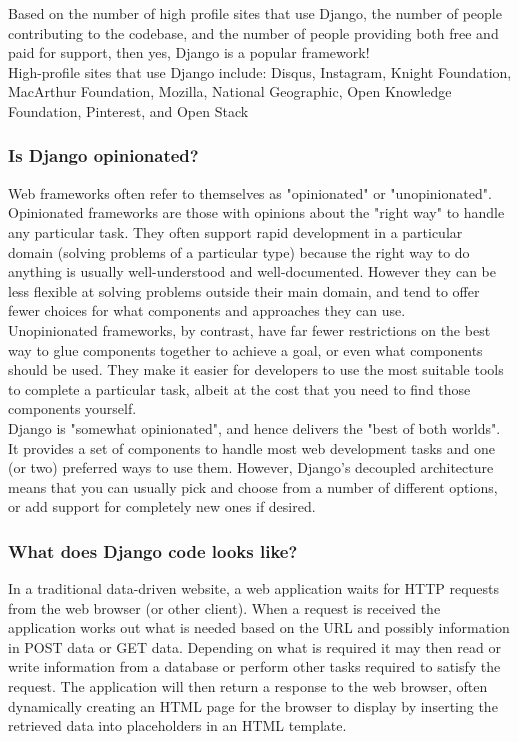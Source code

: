 Based on the number of high profile sites that use Django, the number of people contributing to the codebase, and the number of people providing both free and paid for support, then yes, Django is a popular framework!\\

High-profile sites that use Django include: Disqus, Instagram, Knight Foundation, MacArthur Foundation, Mozilla, National Geographic, Open Knowledge Foundation, Pinterest, and Open Stack\\

\subsubsection{Is Django opinionated?}
Web frameworks often refer to themselves as "opinionated" or "unopinionated".\\

Opinionated frameworks are those with opinions about the "right way" to handle any particular task. They often support rapid development in a particular domain (solving problems of a particular type) because the right way to do anything is usually well-understood and well-documented. However they can be less flexible at solving problems outside their main domain, and tend to offer fewer choices for what components and approaches they can use.\\

Unopinionated frameworks, by contrast, have far fewer restrictions on the best way to glue components together to achieve a goal, or even what components should be used. They make it easier for developers to use the most suitable tools to complete a particular task, albeit at the cost that you need to find those components yourself.\\

Django is "somewhat opinionated", and hence delivers the "best of both worlds". It provides a set of components to handle most web development tasks and one (or two) preferred ways to use them. However, Django's decoupled architecture means that you can usually pick and choose from a number of different options, or add support for completely new ones if desired.\\
\subsubsection{What does Django code looks like?}
In a traditional data-driven website, a web application waits for HTTP requests from the web browser (or other client). When a request is received the application works out what is needed based on the URL and possibly information in POST data or GET data. Depending on what is required it may then read or write information from a database or perform other tasks required to satisfy the request. The application will then return a response to the web browser, often dynamically creating an HTML page for the browser to display by inserting the retrieved data into placeholders in an HTML template.\\

